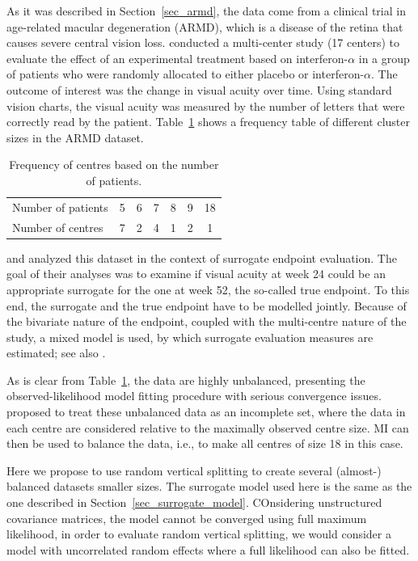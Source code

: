 \documentclass[11pt,a5paper,twoside]{book}
\begin{document}
As it was described in Section~\ref{sec_armd}, the data come from a clinical trial in age-related macular degeneration (ARMD), which is a disease of the retina that causes severe central vision loss. \cite{pharmacological1997} conducted a multi-center study (17 centers) to evaluate the effect of an experimental treatment based on interferon-$\alpha$ in a group of patients who were randomly allocated to either placebo or interferon-$\alpha$. The outcome of interest was the change in visual acuity over time. Using standard vision charts, the visual acuity was measured by the number of letters that were correctly read by the patient. Table~\ref{tab_freq} shows a frequency table of different cluster sizes in the ARMD dataset. 

\begin{table}[t]
\centering
\caption{Frequency of centres based on the number of patients.}
\label{tab_freq}

\vspace*{2mm}

\begin{tabular}{lcccccc}
  \hline\hline
Number of patients & 5 & 6 & 7 & 8 & 9 & 18 \\ 
Number of centres &   7 &   2 &   4 &   1 &   2 &   1 \\ 
   \hline\hline
\end{tabular}
\end{table}

\cite{burzykowski2006} and \cite{alonso2015} analyzed this dataset in the context of surrogate endpoint evaluation. The goal of their analyses was to examine if  visual acuity at week 24 could be an appropriate surrogate for the one at week 52, the so-called true endpoint. To this end, the surrogate and the true endpoint have to be modelled jointly.
Because of the bivariate nature of the endpoint, coupled with the multi-centre nature of the study, a mixed model is used, by which surrogate evaluation measures are estimated; see also \cite{buyse2000}. 

As is clear from Table~\ref{tab_freq}, the data are highly unbalanced, presenting the observed-likelihood model fitting procedure with serious convergence issues. \cite{wim2015} proposed to treat these unbalanced data as an incomplete set, where the data in each centre are considered relative to the maximally observed centre size. MI can then be used to balance the data, i.e., to make all centres of size 18 in this case. 

Here we propose to use random vertical splitting to create several (almost-) balanced datasets smaller sizes. The surrogate model used here is the same as the one described in Section~\ref{sec_surrogate_model}. COnsidering unstructured covariance matrices, the model cannot be converged using full maximum likelihood, in order to evaluate random vertical splitting, we would consider a model with uncorrelated random effects where a full likelihood can also be fitted.
\end{document}

